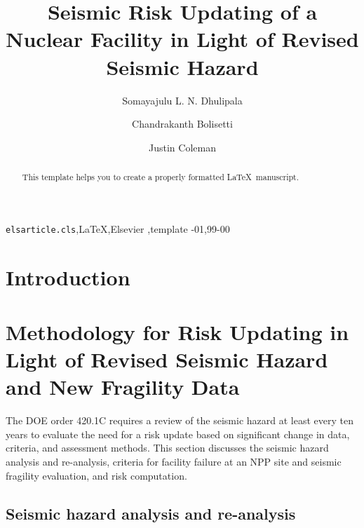 \documentclass[3p]{elsarticle}
\begin{document}
\begin{frontmatter}

\title{Seismic Risk Updating of a Nuclear Facility in Light of Revised Seismic Hazard}

\author[A1]{Somayajulu L. N. Dhulipala}
\author[A1]{Chandrakanth Bolisetti}
\author[A1]{Justin Coleman}
\address[A1]{Idaho National Laboratory, 2525 Fremont Ave., Idaho Falls, ID 83402}


\begin{abstract}
This template helps you to create a properly formatted \LaTeX\ manuscript.
\end{abstract}

\begin{keyword}
\texttt{elsarticle.cls}\sep \LaTeX\sep Elsevier \sep template
-01\sep  99-00
\end{keyword}

\end{frontmatter}

\linenumbers

\section{Introduction}

\section{Methodology for Risk Updating in Light of Revised Seismic Hazard and New Fragility Data}

The DOE order 420.1C \cite{DOE2012a} requires a review of the seismic hazard at least every ten years to evaluate the need for a risk update based on significant change in data, criteria, and assessment methods. This section discusses the seismic hazard analysis and re-analysis, criteria for facility failure at an NPP site and seismic fragility evaluation, and risk computation.

\subsection{Seismic hazard analysis and re-analysis}
\end{document}
